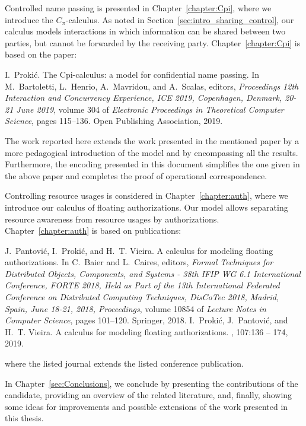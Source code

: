 Controlled name passing is presented in Chapter~\ref{chapter:Cpi}, where we introduce the $C_\pi$-calculus. As noted in Section~\ref{sec:intro_sharing_control}, our calculus models interactions in which information can be shared between two parties, but cannot be forwarded by the receiving party. Chapter~\ref{chapter:Cpi} is based on the paper:
%
\begin{enumerate}
I.~Proki\'c.
\newblock The {C}pi-calculus: a model for confidential name passing.
\newblock In M.~Bartoletti, L.~Henrio, A.~Mavridou, and A.~Scalas, editors,
  {\em Proceedings 12th Interaction and Concurrency Experience, { ICE 2019}, {
  Copenhagen, Denmark, 20-21 June 2019}}, volume 304 of {\em Electronic
  Proceedings in Theoretical Computer Science}, pages 115--136. Open Publishing
  Association, 2019.
\end{enumerate}
%
The work reported here extends the work presented in the mentioned paper by a more pedagogical introduction of the model and by encompassing all the results. Furthermore, the encoding presented in this document simplifies the one given in the above paper and completes the proof of operational correspondence. 


Controlling resource usages is considered in Chapter~\ref{chapter:auth}, where we introduce our calculus of floating authorizations. Our model allows separating resource awareness from resource usages by authorizations. %
Chapter~\ref{chapter:auth} is based on publications:

\begin{enumerate}
%
%
J.~Pantovi{\'c}, I.~Proki{\'c}, and H.~T. Vieira.
\newblock A calculus for modeling floating authorizations.
\newblock In C.~Baier and L.~Caires, editors, {\em Formal Techniques for
  Distributed Objects, Components, and Systems - 38th {IFIP} {WG} 6.1
  International Conference, {FORTE} 2018, Held as Part of the 13th
  International Federated Conference on Distributed Computing Techniques,
  DisCoTec 2018, Madrid, Spain, June 18-21, 2018, Proceedings}, volume 10854 of
  {\em Lecture Notes in Computer Science}, pages 101--120. Springer, 2018.
%
%
I.~Proki{\'c}, J.~Pantovi{\'c}, and H.~T. Vieira.
\newblock A calculus for modeling floating authorizations.
,
  107:136 -- 174, 2019.
%
%
\end{enumerate}
where the listed journal extends the listed conference publication.

In Chapter~\ref{sec:Conclusions}, we conclude by presenting the contributions of the candidate, providing an overview of the related literature, and, finally, showing some ideas for improvements and possible extensions of the work presented in this thesis.





